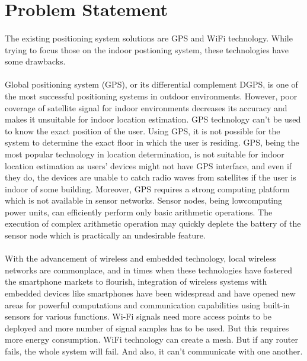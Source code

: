 \documentclass[a4paper,12pt]{report}
\begin{document}
\section{Problem Statement}
\paragraph{}The existing positioning system solutions are GPS and WiFi technology. While trying to focus those on the indoor postioning system, these technologies have some drawbacks.
\paragraph{}Global positioning system (GPS), or its differential complement DGPS, is one of the most successful positioning systems in outdoor environments. However, poor coverage of satellite signal for indoor environments decreases its accuracy and makes it unsuitable for indoor location estimation. GPS technology can’t be used to know the exact position of the user. Using GPS, it is not possible for the system to determine the exact floor in which the user is residing. GPS, being the most popular technology in location determination, is not suitable for indoor location estimation as users’ devices might not have GPS interface, and even if they do, the devices are unable to catch radio waves from satellites if the user is indoor of some building. Moreover, GPS requires a strong computing platform which is not available in sensor networks. Sensor nodes, being lowcomputing power units, can efficiently perform only basic arithmetic operations. The execution of complex arithmetic operation may quickly deplete the battery of the sensor node which is practically an undesirable feature.
\paragraph{}With the advancement of wireless and embedded technology, local wireless networks are commonplace, and in times when these technologies have fostered the smartphone markets to flourish, integration of wireless systems with embedded devices like smartphones have been widespread and have opened new areas for powerful computations and communication capabilities using built-in sensors for various functions. Wi-Fi signals need more access points to be deployed and more number of signal samples has to be used. But this requires more energy consumption. WiFi technology can create a mesh. But if any router fails, the whole system will fail. And also, it can’t communicate with one another.
\end{document}

